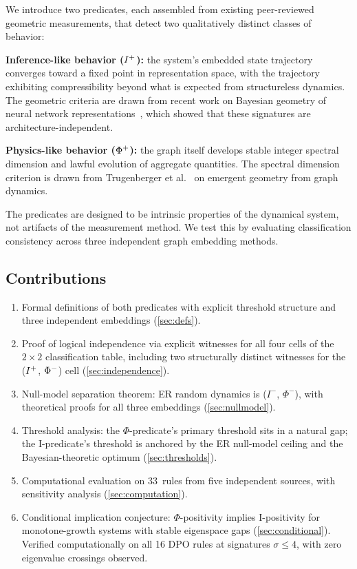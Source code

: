 \documentclass{../shared/primo}
\begin{document}
We introduce two predicates, each assembled from existing peer-reviewed geometric measurements, that detect two qualitatively distinct classes of behavior:

\textbf{Inference-like behavior ($I\textsuperscript{+}$):} the system's embedded state trajectory converges toward a fixed point in representation space, with the trajectory exhibiting compressibility beyond what is expected from structureless dynamics. The geometric criteria are drawn from recent work on Bayesian geometry of neural network representations~\cite{agarwal2026bayesian,agarwal2025gradient}, which showed that these signatures are architecture-independent.

\textbf{Physics-like behavior ($\Phi\textsuperscript{+}$):} the graph itself develops stable integer spectral dimension and lawful evolution of aggregate quantities. The spectral dimension criterion is drawn from Trugenberger et al.~\cite{trugenberger2020dynamics} on emergent geometry from graph dynamics.

The predicates are designed to be intrinsic properties of the dynamical system, not artifacts of the measurement method. We test this by evaluating classification consistency across three independent graph embedding methods.

\subsection{Contributions}

\begin{enumerate}
\item Formal definitions of both predicates with explicit threshold structure and three independent embeddings (\cref{sec:defs}).
\item Proof of logical independence via explicit witnesses for all four cells of the $2 \times 2$ classification table, including two structurally distinct witnesses for the ($I\textsuperscript{+}$, $\Phi\textsuperscript{$-$}$) cell (\cref{sec:independence}).
\item Null-model separation theorem: ER random dynamics is ($I^-$, $\Phi^-$), with theoretical proofs for all three embeddings (\cref{sec:nullmodel}).
\item Threshold analysis: the $\Phi$-predicate's primary threshold sits in a natural gap; the I-predicate's threshold is anchored by the ER null-model ceiling and the Bayesian-theoretic optimum (\cref{sec:thresholds}).
\item Computational evaluation on 33~rules from five independent sources, with sensitivity analysis (\cref{sec:computation}).
\item Conditional implication conjecture: $\Phi$-positivity implies I-positivity for monotone-growth systems with stable eigenspace gaps (\cref{sec:conditional}). Verified computationally on all 16 DPO rules at signatures $\sigma \leq 4$, with zero eigenvalue crossings observed.
\end{enumerate}
\end{document}
